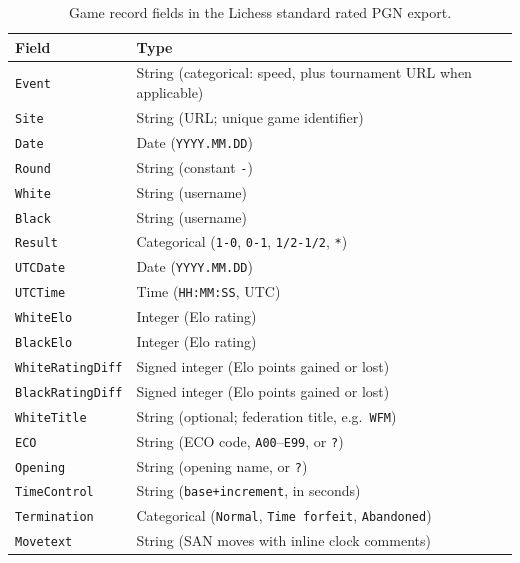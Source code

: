 \documentclass{article}
\begin{document}
\begin{table}[H]
\centering
\caption{Game record fields in the Lichess standard rated PGN export.}
\label{tab:pgn-fields}
\begin{tabular}{ll}
\toprule
\textbf{Field} & \textbf{Type} \\
\midrule
\texttt{Event}           & String (categorical: speed, plus tournament URL when applicable) \\
\texttt{Site}            & String (URL; unique game identifier) \\
\texttt{Date}            & Date (\texttt{YYYY.MM.DD}) \\
\texttt{Round}           & String (constant \texttt{-}) \\
\texttt{White}           & String (username) \\
\texttt{Black}           & String (username) \\
\texttt{Result}          & Categorical (\texttt{1-0}, \texttt{0-1}, \texttt{1/2-1/2}, \texttt{*}) \\
\texttt{UTCDate}         & Date (\texttt{YYYY.MM.DD}) \\
\texttt{UTCTime}         & Time (\texttt{HH:MM:SS}, UTC) \\
\texttt{WhiteElo}        & Integer (Elo rating) \\
\texttt{BlackElo}        & Integer (Elo rating) \\
\texttt{WhiteRatingDiff} & Signed integer (Elo points gained or lost) \\
\texttt{BlackRatingDiff} & Signed integer (Elo points gained or lost) \\
\texttt{WhiteTitle}      & String (optional; federation title, e.g.\ \texttt{WFM}) \\
\texttt{ECO}             & String (ECO code, \texttt{A00}--\texttt{E99}, or \texttt{?}) \\
\texttt{Opening}         & String (opening name, or \texttt{?}) \\
\texttt{TimeControl}     & String (\texttt{base+increment}, in seconds) \\
\texttt{Termination}     & Categorical (\texttt{Normal}, \texttt{Time forfeit}, \texttt{Abandoned}) \\
\texttt{Movetext}        & String (SAN moves with inline clock comments) \\
\bottomrule
\end{tabular}
\end{table}
\end{document}
